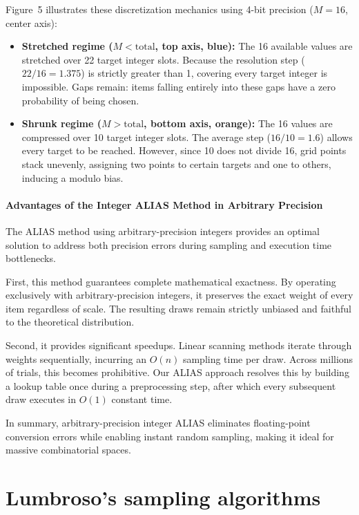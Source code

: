 
Figure~5 illustrates these discretization mechanics using 4-bit precision ($M = 16$, center axis):
\begin{itemize}
    \item \textbf{Stretched regime ($M < \text{total}$, top axis, blue):} The 16 available values are stretched over 22 target integer slots. Because the resolution step ($22/16 = 1.375$) is strictly greater than 1, covering every target integer is impossible. Gaps remain: items falling entirely into these gaps have a zero probability of being chosen.
    \item \textbf{Shrunk regime ($M > \text{total}$, bottom axis, orange):} The 16 values are compressed over 10 target integer slots. The average step ($16/10 = 1.6$) allows every target to be reached. However, since 10 does not divide 16, grid points stack unevenly, assigning two points to certain targets and one to others, inducing a modulo bias.
\end{itemize}

\paragraph{Advantages of the Integer ALIAS Method in Arbitrary Precision}
The ALIAS method using arbitrary-precision integers provides an optimal solution to address both precision errors during sampling and execution time bottlenecks.

First, this method guarantees complete mathematical exactness. By operating exclusively with arbitrary-precision integers, it preserves the exact weight of every item regardless of scale. The resulting draws remain strictly unbiased and faithful to the theoretical distribution.

Second, it provides significant speedups. Linear scanning methods iterate through weights sequentially, incurring an $O(n)$ sampling time per draw. Across millions of trials, this becomes prohibitive. Our ALIAS approach resolves this by building a lookup table once during a preprocessing step, after which every subsequent draw executes in $O(1)$ constant time.

In summary, arbitrary-precision integer ALIAS eliminates floating-point conversion errors while enabling instant random sampling, making it ideal for massive combinatorial spaces.




\section{Lumbroso's sampling algorithms}


